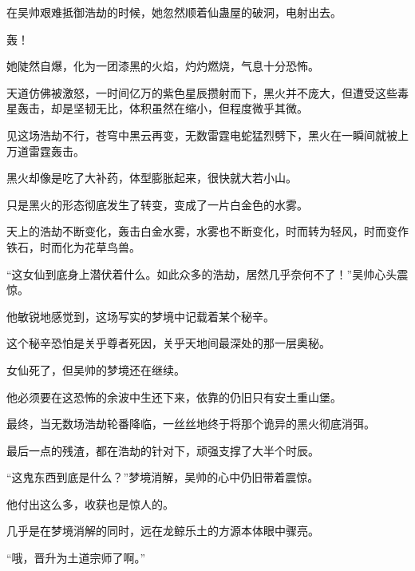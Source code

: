 \begin{this_body}
在吴帅艰难抵御浩劫的时候，她忽然顺着仙蛊屋的破洞，电射出去。

轰！

她陡然自爆，化为一团漆黑的火焰，灼灼燃烧，气息十分恐怖。

天道仿佛被激怒，一时间亿万的紫色星辰攒射而下，黑火并不庞大，但遭受这些毒星轰击，却是坚韧无比，体积虽然在缩小，但程度微乎其微。

见这场浩劫不行，苍穹中黑云再变，无数雷霆电蛇猛烈劈下，黑火在一瞬间就被上万道雷霆轰击。

黑火却像是吃了大补药，体型膨胀起来，很快就大若小山。

只是黑火的形态彻底发生了转变，变成了一片白金色的水雾。

天上的浩劫不断变化，轰击白金水雾，水雾也不断变化，时而转为轻风，时而变作铁石，时而化为花草鸟兽。

“这女仙到底身上潜伏着什么。如此众多的浩劫，居然几乎奈何不了！”吴帅心头震惊。

他敏锐地感觉到，这场写实的梦境中记载着某个秘辛。

这个秘辛恐怕是关乎尊者死因，关乎天地间最深处的那一层奥秘。

女仙死了，但吴帅的梦境还在继续。

他必须要在这恐怖的余波中生还下来，依靠的仍旧只有安土重山堡。

最终，当无数场浩劫轮番降临，一丝丝地终于将那个诡异的黑火彻底消弭。

最后一点的残渣，都在浩劫的针对下，顽强支撑了大半个时辰。

“这鬼东西到底是什么？”梦境消解，吴帅的心中仍旧带着震惊。

他付出这么多，收获也是惊人的。

几乎是在梦境消解的同时，远在龙鲸乐土的方源本体眼中骤亮。

“哦，晋升为土道宗师了啊。”

\end{this_body}

